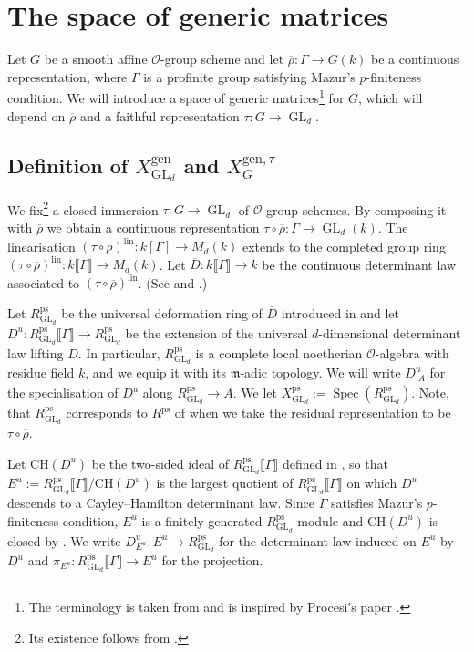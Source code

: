 \documentclass{amsart}
\theoremstyle{definition}
\theoremstyle{remark}
\DeclareMathOperator{\GL}{GL}
\DeclareMathOperator{\Spec}{Spec}
\newcommand{\mm}{\mathfrak m}
\newcommand{\OO}{\mathcal O}
\newcommand{\br}[1]{\llbracket #1\rrbracket}
\newcommand{\rhobar}{\overline{\rho}}
\newcommand{\ps}{\mathrm{ps}}
\newcommand{\CH}{\mathrm{CH}}
\newcommand{\gen}{\mathrm{gen}}
\newcommand{\Dbar}{\overline{D}}
\newcommand{\RpsGLd}{R^{\ps}_{\GL_d}}
\newcommand{\lin}{\mathrm{lin}}
\newcommand{\XgenGLd}{X^{\gen}_{\GL_d}}
\newcommand{\XgenGtau}{X^{\gen, \tau}_G}
\begin{document}
\section{The space of generic matrices}\label{sec_gen_matrix}
Let $G$ be  a smooth affine $\OO$-group scheme  and let $\rhobar:\Gamma\rightarrow G(k)$ be a continuous representation, where $\Gamma$ is a profinite group satisfying Mazur's $p$-finiteness condition.
We will introduce a space of generic matrices\footnote{The terminology is taken from \cite{BIP_new} and is inspired by Procesi's paper \cite{Pro87}.} for $G$, which will depend on $\rhobar$ and a faithful representation $\tau : G \to \GL_d$.

\subsection{\texorpdfstring{Definition of $\XgenGLd$ and $\XgenGtau$}{Definition of XgenGLd and XgenGtau}}\label{def_and_1prop}

We fix\footnote{Its existence follows from \cite[Exp.\,$\mathrm{VII}_B$, Rem.\,11.11.1]{SGA3_new}.} a closed immersion $\tau : G \to \GL_d$ of $\OO$-group schemes.  By composing it with $\rhobar$  we obtain a continuous
representation $\tau\circ \rhobar: \Gamma\rightarrow \GL_d(k)$.
The linearisation $(\tau \circ \rhobar)^{\lin} : k[\Gamma] \to M_d(k)$ extends to the completed group ring $(\tau \circ \rhobar)^{\lin} : k\br{\Gamma} \to M_d(k)$. Let $\Dbar:k\br{\Gamma} \rightarrow k$ be the continuous determinant law associated to $(\tau \circ \rhobar)^{\lin}$. (See \cite{che_durham} and \cite[Section 3]{WE_alg}.)

Let $\RpsGLd$ be the universal deformation ring of $\Dbar$ introduced in \cite[Section 3.1]{che_durham} and let $D^u: \RpsGLd\br{\Gamma}\rightarrow \RpsGLd$ be the extension 
of the universal $d$-dimensional
determinant law lifting $\Dbar$. In particular, $\RpsGLd$
is a complete local noetherian $\OO$-algebra with residue field
$k$, and we equip it with its $\mm$-adic topology. We will write $D^u_{|A}$ for the 
specialisation of $D^u$ along $\RpsGLd\rightarrow A$.
We let $X^{\ps}_{\GL_d} := \Spec(\RpsGLd)$.
Note, that $\RpsGLd$ corresponds to $R^{\ps}$ of \cite{BIP_new} when we take the residual representation to be $\tau \circ \rhobar$.



Let $\CH(D^u)$ be the two-sided ideal of $\RpsGLd\br{\Gamma}$ defined in \cite[Section 1.17]{che_durham}, so that  $E^u := \RpsGLd\br{\Gamma}/ \CH(D^u)$ is the largest quotient of $\RpsGLd\br{\Gamma}$ on which $D^u$ descends to a Cayley--Hamilton determinant law. Since $\Gamma$ satisfies Mazur's $p$-finiteness condition, 
$E^u$ is a finitely generated $\RpsGLd$-module and $\CH(D^u)$ is closed by \cite[Proposition 3.6]{WE_alg}. We write $D^u_{E^u} : E^u \to \RpsGLd$ for the determinant law induced on $E^u$ by $D^u$ and $\pi_{E^u} : \RpsGLd\br{\Gamma} \to E^u$ for the projection.
\end{document}
